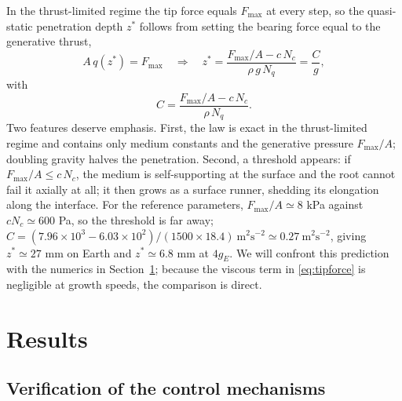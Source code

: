 \documentclass[preprint,12pt]{elsarticle}
\begin{document}
In the thrust-limited regime the tip force equals $F_{\max}$ at every step,
so the quasi-static penetration depth $z^{*}$ follows from setting the
bearing force equal to the generative thrust,
\begin{equation}
  A\,q(z^{*})=F_{\max}
  \quad\Longrightarrow\quad
  z^{*} = \frac{F_{\max}/A - c\,N_c}{\rho\,g\,N_q}
  = \frac{C}{g},
  \label{eq:zstar}
\end{equation}
with
\begin{equation}
  C = \frac{F_{\max}/A - c\,N_c}{\rho\,N_q}.
  \label{eq:C}
\end{equation}
Two features deserve emphasis. First, the law is exact in the thrust-limited
regime and contains only medium constants and the generative pressure
$F_{\max}/A$; doubling gravity halves the penetration. Second, a threshold
appears: if $F_{\max}/A \le c\,N_c$, the medium is self-supporting at the
surface and the root cannot fail it axially at all; it then grows as a
surface runner, shedding its elongation along the interface. For the
reference parameters, $F_{\max}/A\simeq8$ kPa against $cN_c\simeq600$ Pa, so
the threshold is far away;
$C=(7.96\times10^3-6.03\times10^2)/(1500\times18.4)\ \text{m}^2\text{s}^{-2}
\simeq0.27\ \text{m}^2\text{s}^{-2}$, giving $z^{*}\simeq27$ mm on Earth and
$z^{*}\simeq6.8$ mm at $4g_E$. We will confront this prediction with the
numerics in Section~\ref{sec:results}; because the viscous term in
\eqref{eq:tipforce} is negligible at growth speeds, the comparison is
direct.

\section{Results}
\label{sec:results}

\subsection{Verification of the control mechanisms}
\label{sec:verif}
\end{document}

